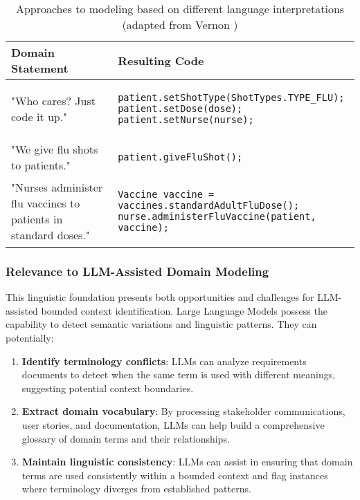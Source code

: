 \begin{table}[htbp]
    \centering
    \begin{adjustbox}{max width=\textwidth}
    \begin{tabular}{|m{5cm}|m{9cm}|}
    \hline
    \rowcolor{gray!20}
    \textbf{Domain Statement} & \textbf{Resulting Code} \\
    \hline
    "Who cares? Just code it up." &
\begin{lstlisting}[aboveskip=10pt, belowskip=0pt]
patient.setShotType(ShotTypes.TYPE_FLU);
patient.setDose(dose);
patient.setNurse(nurse);
\end{lstlisting} \\
    \hline
    "We give flu shots to patients." &
\begin{lstlisting}[aboveskip=10pt, belowskip=0pt]
patient.giveFluShot();
\end{lstlisting} \\
    \hline
    "Nurses administer flu vaccines to patients in standard doses." &
\begin{lstlisting}[aboveskip=10pt, belowskip=0pt]
Vaccine vaccine = 
vaccines.standardAdultFluDose();
nurse.administerFluVaccine(patient, vaccine);
\end{lstlisting} \\
    \hline
    \end{tabular}
    \end{adjustbox}
    \caption{Approaches to modeling based on different language interpretations (adapted from Vernon \autocite[p.~22]{vernon2013implementing})}
    \label{tab:ubiquitous-language-examples}
\end{table}

\subsubsection{Relevance to LLM-Assisted Domain Modeling}
This linguistic foundation presents both opportunities and challenges for LLM-assisted bounded context identification. Large Language Models possess the capability to detect semantic variations and linguistic patterns. They can potentially:

\begin{enumerate}
    \item \textbf{Identify terminology conflicts}: LLMs can analyze requirements documents to detect when the same term is used with different meanings, suggesting potential context boundaries.
    
    \item \textbf{Extract domain vocabulary}: By processing stakeholder communications, user stories, and documentation, LLMs can help build a comprehensive glossary of domain terms and their relationships.
    
    \item \textbf{Maintain linguistic consistency}: LLMs can assist in ensuring that domain terms are used consistently within a bounded context and flag instances where terminology diverges from established patterns.
\end{enumerate}

